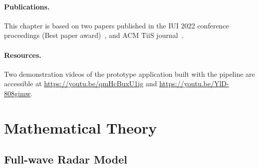 \paragraph{Publications.} This chapter is based on two papers published in the IUI 2022 conference proceedings (Best paper award)~\cite{Sluyters:2022:IUI}, and ACM TiiS journal~\cite{Sluyters:2023}.

\paragraph{Resources.} Two demonstration videos of the prototype application built with the pipeline are accessible at \url{https://youtu.be/qmHcBuxU1ig} and \url{https://youtu.be/YlD-808gimw}.


\section{Mathematical Theory} \label{sec:radar-challenges:mathematical-theory}

\subsection{Full-wave Radar Model} \label{sec:radar-challenges:mathematical-theory:radar-model}


